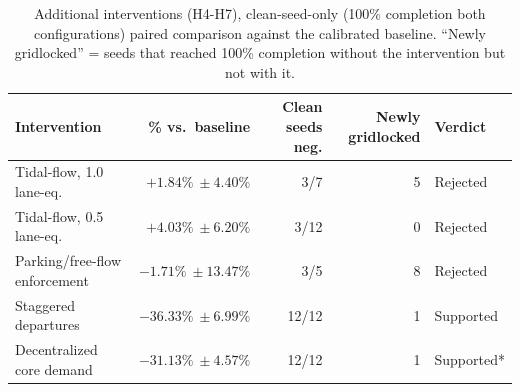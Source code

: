 \begin{table}[htbp]
\centering
\caption{Additional interventions (H4-H7), clean-seed-only (100\% completion both configurations) paired comparison against the calibrated baseline. ``Newly gridlocked'' = seeds that reached 100\% completion without the intervention but not with it.}
\label{tab:additional}
\begin{tabular}{lrrrl}
\hline
Intervention & \% vs.\ baseline & Clean seeds neg. & Newly gridlocked & Verdict \\
\hline
Tidal-flow, 1.0 lane-eq. & $+1.84\%\ \pm 4.40\%$ & 3/7 & 5 & Rejected \\
Tidal-flow, 0.5 lane-eq. & $+4.03\%\ \pm 6.20\%$ & 3/12 & 0 & Rejected \\
Parking/free-flow enforcement & $-1.71\%\ \pm 13.47\%$ & 3/5 & 8 & Rejected \\
Staggered departures & $-36.33\%\ \pm 6.99\%$ & 12/12 & 1 & Supported \\
Decentralized core demand & $-31.13\%\ \pm 4.57\%$ & 12/12 & 1 & Supported* \\
\hline
\end{tabular}
\end{table}
